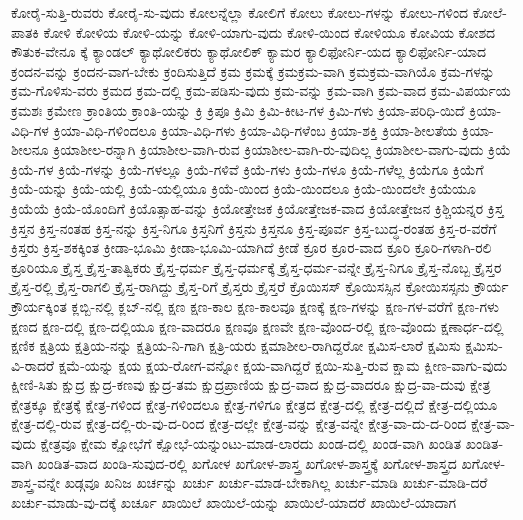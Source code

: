 {ಕೋರೈ-ಸುತ್ತಿ-ರುವರು
ಕೋರೈ-ಸು-ವುದು
ಕೋಲನ್ನೆಲ್ಲಾ
ಕೋಲಿಗೆ
ಕೋಲು
ಕೋಲು-ಗಳನ್ನು
ಕೋಲು-ಗಳಿಂದ
ಕೋಲೆ-ಪಾತಕಿ
ಕೋಳಿ
ಕೋಳಿಯ
ಕೋಳಿ-ಯನ್ನು
ಕೋಳಿ-ಯಾಗು-ವುದು
ಕೋಳಿ-ಯಿಂದ
ಕೋಳಿಯೂ
ಕೋವಿಯ
ಕೋಶದ
ಕೌತುಕ-ವೇನೂ
ಕ್ಕೆ
ಕ್ಯಾಂಡಲ್
ಕ್ಯಾಥೋಲಿಕರು
ಕ್ಯಾಥೋಲಿಕ್
ಕ್ಯಾಮರ
ಕ್ಯಾಲಿಫೋರ್ನಿ-ಯದ
ಕ್ಯಾಲಿಫೋರ್ನಿ-ಯಾದ
ಕ್ರಂದನ-ವನ್ನು
ಕ್ರಂದನ-ವಾಗ-ಬೇಕು
ಕ್ರಂದಿಸುತ್ತಿದೆ
ಕ್ರಮ
ಕ್ರಮಕ್ಕೆ
ಕ್ರಮಕ್ರಮ-ವಾಗಿ
ಕ್ರಮಕ್ರಮ-ವಾಗಿಯೊ
ಕ್ರಮ-ಗಳನ್ನು
ಕ್ರಮ-ಗೊಳಿಸು-ವರು
ಕ್ರಮದ
ಕ್ರಮ-ದಲ್ಲಿ
ಕ್ರಮ-ಪಡಿಸು-ವುದು
ಕ್ರಮ-ವನ್ನು
ಕ್ರಮ-ವಾಗಿ
ಕ್ರಮ-ವಾದ
ಕ್ರಮ-ವಿಪರ್ಯಯ
ಕ್ರಮಶಃ
ಕ್ರಮೇಣ
ಕ್ರಾಂತಿಯ
ಕ್ರಾಂತಿ-ಯನ್ನು
ಕ್ರಿ
ಕ್ರಿಪೂ
ಕ್ರಿಮಿ
ಕ್ರಿಮಿ-ಕೀಟ-ಗಳ
ಕ್ರಿಮಿ-ಗಳು
ಕ್ರಿಯಾ-ಪರಿಧಿ-ಯಿದೆ
ಕ್ರಿಯಾ-ವಿಧಿ-ಗಳ
ಕ್ರಿಯಾ-ವಿಧಿ-ಗಳಿಂದಲೂ
ಕ್ರಿಯಾ-ವಿಧಿ-ಗಳು
ಕ್ರಿಯಾ-ವಿಧಿ-ಗಳೆಂಬ
ಕ್ರಿಯಾ-ಶಕ್ತಿ
ಕ್ರಿಯಾ-ಶೀಲತೆಯ
ಕ್ರಿಯಾ-ಶೀಲನೂ
ಕ್ರಿಯಾಶೀಲ-ರನ್ನಾಗಿ
ಕ್ರಿಯಾಶೀಲ-ವಾಗಿ-ರುವ
ಕ್ರಿಯಾಶೀಲ-ವಾಗಿ-ರು-ವುದಿಲ್ಲ
ಕ್ರಿಯಾಶೀಲ-ವಾಗು-ವುದು
ಕ್ರಿಯೆ
ಕ್ರಿಯೆ-ಗಳ
ಕ್ರಿಯೆ-ಗಳನ್ನು
ಕ್ರಿಯೆ-ಗಳಲ್ಲೂ
ಕ್ರಿಯೆ-ಗಳಿವೆ
ಕ್ರಿಯೆ-ಗಳು
ಕ್ರಿಯೆ-ಗಳೂ
ಕ್ರಿಯೆ-ಗಳೆಲ್ಲ
ಕ್ರಿಯೆಗೂ
ಕ್ರಿಯೆಗೆ
ಕ್ರಿಯೆ-ಯನ್ನು
ಕ್ರಿಯೆ-ಯಲ್ಲಿ
ಕ್ರಿಯೆ-ಯಲ್ಲಿಯೂ
ಕ್ರಿಯೆ-ಯಿಂದ
ಕ್ರಿಯೆ-ಯಿಂದಲೂ
ಕ್ರಿಯೆ-ಯಿಂದಲೇ
ಕ್ರಿಯೆಯೂ
ಕ್ರಿಯೆಯೆ
ಕ್ರಿಯೆ-ಯೊಂದಿಗೆ
ಕ್ರಿಯೊತ್ಸಾಹ-ವನ್ನು
ಕ್ರಿಯೋತ್ತೇಜಕ
ಕ್ರಿಯೋತ್ತೇಜಕ-ವಾದ
ಕ್ರಿಯೋತ್ತೇಜನ
ಕ್ರಿಶ್ಚಿಯನ್ನರ
ಕ್ರಿಸ್ತ
ಕ್ರಿಸ್ತನ
ಕ್ರಿಸ್ತ-ನಂತಹ
ಕ್ರಿಸ್ತ-ನನ್ನು
ಕ್ರಿಸ್ತ-ನಿಗೂ
ಕ್ರಿಸ್ತನಿಗೆ
ಕ್ರಿಸ್ತನು
ಕ್ರಿಸ್ತನೂ
ಕ್ರಿಸ್ತ-ಪೂರ್ವ
ಕ್ರಿಸ್ತ-ಬುದ್ಧ-ರಂತಹ
ಕ್ರಿಸ್ತ-ರ-ವರೆಗೆ
ಕ್ರಿಸ್ತರು
ಕ್ರಿಸ್ತ-ಶಕಕ್ಕಿಂತ
ಕ್ರೀಡಾ-ಭೂಮಿ
ಕ್ರೀಡಾ-ಭೂಮಿ-ಯಾಗಿದೆ
ಕ್ರೀಡೆ
ಕ್ರೂರ
ಕ್ರೂರ-ವಾದ
ಕ್ರೂರಿ
ಕ್ರೂರಿ-ಗಳಾಗಿ-ರಲಿ
ಕ್ರೂರಿಯೂ
ಕ್ರೈಸ್ತ
ಕ್ರೈಸ್ತ-ತಾತ್ವಿಕರು
ಕ್ರೈಸ್ತ-ಧರ್ಮ
ಕ್ರೈಸ್ತ-ಧರ್ಮಕ್ಕೆ
ಕ್ರೈಸ್ತ-ಧರ್ಮ-ವನ್ನೇ
ಕ್ರೈಸ್ತ-ನಿಗೂ
ಕ್ರೈಸ್ತ-ನೊಬ್ಬ
ಕ್ರೈಸ್ತರ
ಕ್ರೈಸ್ತ-ರಲ್ಲಿ
ಕ್ರೈಸ್ತ-ರಾಗಲಿ
ಕ್ರೈಸ್ತ-ರಾಗಿದ್ದು
ಕ್ರೈಸ್ತ-ರಿಗೆ
ಕ್ರೈಸ್ತರು
ಕ್ರೈಸ್ತರೆ
ಕ್ರೊಯಿಸಸ್
ಕ್ರೊಯಿಸಸ್ಸಿನ
ಕ್ರೋಯಿಸಸ್ಸನು
ಕ್ರೌರ್ಯ
ಕ್ರೌರ್ಯಕ್ಕಿಂತ
ಕ್ಲಬ್ಬಿ-ನಲ್ಲಿ
ಕ್ಲಬ್-ನಲ್ಲಿ
ಕ್ಷಣ
ಕ್ಷಣ-ಕಾಲ
ಕ್ಷಣ-ಕಾಲವೂ
ಕ್ಷಣಕ್ಕೆ
ಕ್ಷಣ-ಗಳನ್ನು
ಕ್ಷಣ-ಗಳ-ವರೆಗೆ
ಕ್ಷಣ-ಗಳು
ಕ್ಷಣದ
ಕ್ಷಣ-ದಲ್ಲಿ
ಕ್ಷಣ-ದಲ್ಲಿಯೂ
ಕ್ಷಣ-ವಾದರೂ
ಕ್ಷಣವೂ
ಕ್ಷಣವೇ
ಕ್ಷಣ-ವೊಂದ-ರಲ್ಲಿ
ಕ್ಷಣ-ವೊಂದು
ಕ್ಷಣಾರ್ಧ-ದಲ್ಲಿ
ಕ್ಷಣಿಕ
ಕ್ಷತ್ರಿಯ
ಕ್ಷತ್ರಿಯ-ನನ್ನು
ಕ್ಷತ್ರಿಯ-ನಿ-ಗಾಗಿ
ಕ್ಷತ್ರಿ-ಯರು
ಕ್ಷಮಾಶೀಲ-ರಾಗಿದ್ದರೋ
ಕ್ಷಮಿಸ-ಲಾರೆ
ಕ್ಷಮಿಸು
ಕ್ಷಮಿಸು-ವಿ-ರಾದರೆ
ಕ್ಷಮೆ-ಯನ್ನು
ಕ್ಷಯ
ಕ್ಷಯ-ರೋಗ-ವನ್ನೋ
ಕ್ಷಯ-ವಾಗಿದ್ದರೆ
ಕ್ಷಯಿ-ಸುತ್ತಿ-ರುವ
ಕ್ಷಾಮ
ಕ್ಷೀಣ-ವಾಗು-ವುದು
ಕ್ಷೀಣಿ-ಸಿತು
ಕ್ಷುದ್ರ
ಕ್ಷುದ್ರ-ಕಣವು
ಕ್ಷುದ್ರ-ತಮ
ಕ್ಷುದ್ರಪ್ರಾಣಿಯ
ಕ್ಷುದ್ರ-ವಾದ
ಕ್ಷುದ್ರ-ವಾದರೂ
ಕ್ಷುದ್ರ-ವಾ-ದುವು
ಕ್ಷೇತ್ರ
ಕ್ಷೇತ್ರಕ್ಕೂ
ಕ್ಷೇತ್ರಕ್ಕೆ
ಕ್ಷೇತ್ರ-ಗಳಿಂದ
ಕ್ಷೇತ್ರ-ಗಳಿಂದಲೂ
ಕ್ಷೇತ್ರ-ಗಳಿಗೂ
ಕ್ಷೇತ್ರದ
ಕ್ಷೇತ್ರ-ದಲ್ಲಿ
ಕ್ಷೇತ್ರ-ದಲ್ಲಿದೆ
ಕ್ಷೇತ್ರ-ದಲ್ಲಿಯೂ
ಕ್ಷೇತ್ರ-ದಲ್ಲಿ-ರುವ
ಕ್ಷೇತ್ರ-ದಲ್ಲಿ-ರು-ವು-ದ-ರಿಂದ
ಕ್ಷೇತ್ರ-ದಲ್ಲೇ
ಕ್ಷೇತ್ರ-ವನ್ನು
ಕ್ಷೇತ್ರ-ವನ್ನೇ
ಕ್ಷೇತ್ರ-ವಾ-ದು-ದ-ರಿಂದ
ಕ್ಷೇತ್ರ-ವಾ-ವುದು
ಕ್ಷೇತ್ರವೂ
ಕ್ಷೇಮ
ಕ್ಷೋಭೆಗೆ
ಕ್ಷೋಭೆ-ಯನ್ನುಂಟು-ಮಾಡ-ಲಾರದು
ಖಂಡ-ದಲ್ಲಿ
ಖಂಡ-ವಾಗಿ
ಖಂಡಿತ
ಖಂಡಿತ-ವಾಗಿ
ಖಂಡಿತ-ವಾದ
ಖಂಡಿ-ಸುವುದ-ರಲ್ಲಿ
ಖಗೋಳ
ಖಗೋಳ-ಶಾಸ್ತ್ರ
ಖಗೋಳ-ಶಾಸ್ತ್ರಕ್ಕೆ
ಖಗೋಳ-ಶಾಸ್ತ್ರದ
ಖಗೋಳ-ಶಾಸ್ತ್ರ-ವನ್ನೇ
ಖಡ್ಗವೂ
ಖನಿಜ
ಖರ್ಚನ್ನು
ಖರ್ಚು
ಖರ್ಚು-ಮಾಡ-ಬೇಕಾಗಿಲ್ಲ
ಖರ್ಚು-ಮಾಡಿ
ಖರ್ಚು-ಮಾಡಿ-ದರೆ
ಖರ್ಚು-ಮಾಡು-ವು-ದಕ್ಕೆ
ಖರ್ಚೂ
ಖಾಯಿಲೆ
ಖಾಯಿಲೆ-ಯನ್ನು
ಖಾಯಿಲೆ-ಯಾದರೆ
ಖಾಯಿಲೆ-ಯಾದಾಗ
}
